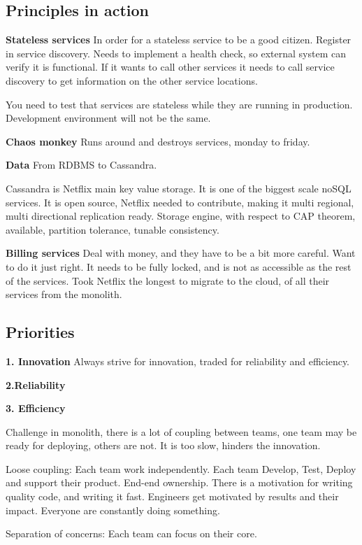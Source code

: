 {\subsection{Principles in action}
\textbf{Stateless services}
In order for a stateless service to be a good citizen. Register in service discovery. Needs to implement a health check, so external system can verify it is functional. If it wants to call other services it needs to call service discovery to get information on the other service locations.

You need to test that services are stateless while they are running in production. Development environment will not be the same.

\textbf{Chaos monkey}
Runs around and destroys services, monday to friday.

\textbf{Data}
From RDBMS to Cassandra.

Cassandra is Netflix main key value storage.
It is one of the biggest scale noSQL services. It is open source, Netflix needed to contribute, making it multi regional, multi directional replication ready.
Storage engine, with respect to CAP theorem, available, partition tolerance, tunable consistency. 

\textbf{Billing services}
Deal with money, and they have to be a bit more careful. Want to do it just right. 
It needs to be fully locked, and is not as accessible as the rest of the services.
Took Netflix the longest to migrate to the cloud, of all their services from the monolith.


\subsection{Priorities}
\textbf{1. Innovation}
Always strive for innovation, traded for reliability and efficiency.

\textbf{2.Reliability}


\textbf{3. Efficiency}

Challenge in monolith, there is a lot of coupling between teams, one team may be ready for deploying, others are not. It is too slow, hinders the innovation.

Loose coupling: Each team work independently. Each team Develop, Test, Deploy and support their product. End-end ownership.
There is a motivation for writing quality code, and writing it fast. Engineers get motivated by results and their impact. Everyone are constantly doing something.

Separation of concerns:
Each team can focus on their core.

}
